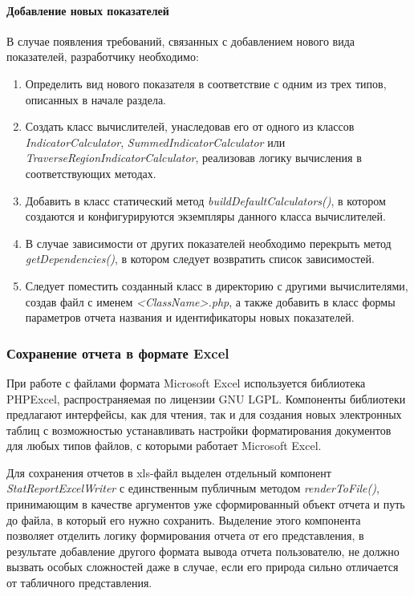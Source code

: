 \paragraph{Добавление новых показателей} В случае появления требований, связанных с добавлением
нового вида показателей, разработчику необходимо:
\begin{enumerate}
\item{
  Определить вид нового показателя в соответствие с одним из трех типов, описанных в начале раздела. 
}
\item{
  Создать класс вычислителей, унаследовав его от одного из классов
\textit{IndicatorCalculator}, \textit{SummedIndicatorCalculator} или \textit{TraverseRegionIndicatorCalculator},
реализовав логику вычисления в соответствующих методах.
}
\item{
  Добавить в класс статический метод \textit{buildDefaultCalculators()}, в котором создаются и 
конфигурируются экземпляры данного класса вычислителей.
}
\item{
  В случае зависимости от других показателей необходимо перекрыть метод \textit{getDependencies()},
в котором следует возвратить список зависимостей.
}
\item{
  Следует поместить созданный класс в директорию с другими вычислителями, создав файл с именем \textit{<ClassName>.php},
  а также добавить в класс формы параметров отчета названия и идентификаторы новых показателей.
}
\end{enumerate}

\subsubsection{Сохранение отчета в формате Excel}
При работе с файлами формата Microsoft Excel используется библиотека PHPExcel\cite{phpexcel},
распространяемая по лицензии GNU LGPL. Компоненты библиотеки предлагают интерфейсы, как
для чтения, так и для создания новых электронных таблиц с возможностью устанавливать
настройки форматирования документов для любых типов файлов, с которыми работает Microsoft Excel.

Для сохранения отчетов в xls-файл выделен отдельный компонент \textit{StatReportExcelWriter}
с единственным публичным методом \textit{renderToFile()}, принимающим в качестве аргументов уже
сформированный объект отчета и путь до файла, в который его нужно сохранить.
Выделение этого компонента позволяет отделить логику формирования отчета от его представления, 
в результате добавление другого формата вывода отчета пользователю, не должно вызвать особых 
сложностей даже в случае, если его природа сильно отличается от табличного представления.

